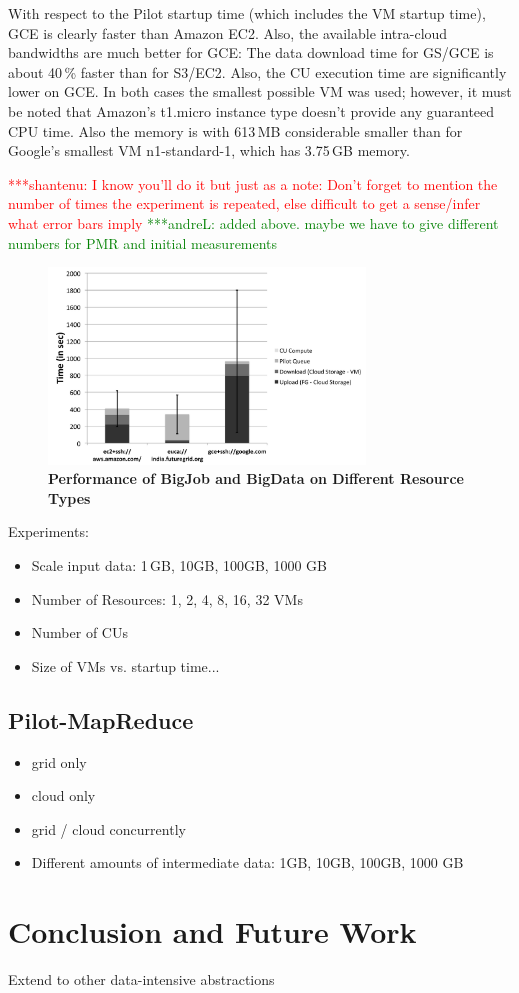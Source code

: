 \documentclass[times]{cpeauth}
\newcommand{\jhanote}[1]{ {\textcolor{red} { ***shantenu: #1 }}}
\newcommand{\alnote}[1]{ {\textcolor{green} { ***andreL: #1 }}}
\newcommand{\alnote}[1]{}
\newcommand{\jhanote}[1]{}
\newcommand{\pilot}{Pilot\xspace}
\newcommand{\cu}{CU\xspace}
\begin{document}
With respect to the \pilot startup time (which includes the VM startup time), 
GCE is clearly faster than Amazon EC2. Also, the available intra-cloud 
bandwidths are much better for GCE: The data download time for GS/GCE is about 
40\,\% faster than for S3/EC2. Also, the \cu execution time are significantly 
lower on GCE. In both cases the smallest possible VM was used; however, it 
must be noted that Amazon's t1.micro instance type doesn't provide any 
guaranteed CPU time. Also the memory is with 613\,MB considerable smaller than 
for Google's smallest VM n1-standard-1, which has 3.75\,GB memory.

\jhanote{I know you'll do it but just as a
  note: Don't forget to mention the number of times the experiment is
  repeated, else difficult to get a sense/infer what error bars 
imply}\alnote{added above. maybe we have to give different numbers for PMR and 
initial measurements}
\begin{figure}[htbp]
	\centering
		\includegraphics[width=0.75\textwidth]{performance/pd_google_aws.pdf}
	\caption{\textbf{Performance of BigJob and BigData on Different Resource Types}}
	\label{fig:performance_pd_google_aws}
\end{figure}



Experiments:
\begin{itemize}
	\item Scale input data: 1\,GB, 10GB, 100GB, 1000 GB
	\item Number of Resources: 1, 2, 4, 8, 16, 32 VMs
	\item Number of CUs
	\item Size of VMs vs. startup time...
\end{itemize}



\subsection{Pilot-MapReduce}
\begin{itemize}
	\item grid only
	\item cloud only
	\item grid / cloud concurrently
	\item  Different amounts of intermediate data: 1GB, 10GB, 100GB, 1000 GB	
\end{itemize}

\section{Conclusion and Future Work}

Extend to other data-intensive abstractions



\end{document}
